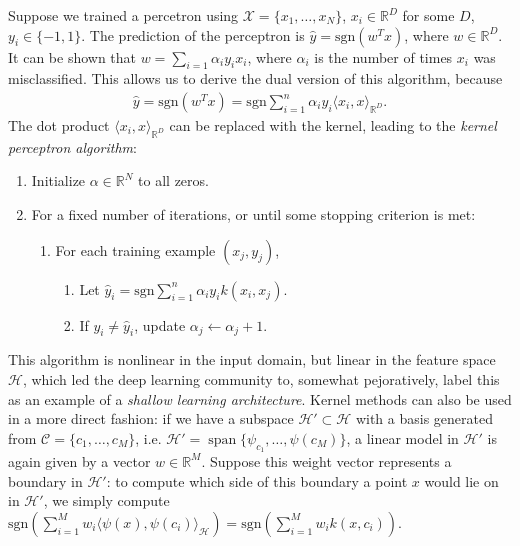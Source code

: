 \documentclass[letterpaper,12pt,peerreviewca,draftcls]{IEEEtran}
\newcommand{\al}{\alpha}
\newcommand{\R}{\mathbb{R}}
\def\l{\langle}
\def\r{\rangle}
\newcommand{\weight}{w}
\newcommand{\fspace}{\mathcal{H}}
\newcommand{\fmap}{\psi}
\newcommand{\kernel}{k}
\newcommand{\sampSet}{\mathcal{X}}
\newcommand{\sampSetLong}{\{x_1, \dots, x_{\nsamp}\}}
\newcommand{\nsamp}{N}
\newcommand{\ncent}{M}
\newcommand{\shCent}{\mathcal{C}}
\newcommand{\shCentLong}{\{c_1,\dots,c_{\ncent}\}}
\newcommand{\sgn}{\mathrm{sgn}}
\def\l{\langle}
\def\r{\rangle}
\DeclareMathOperator{\Span}{span}
\begin{document}
Suppose we trained a percetron using $\sampSet=\sampSetLong$, $x_i\in\R^D$ for some $D$, $y_i\in\{-1, 1\}$.
The prediction of the perceptron is $\hat{y}=\sgn(w^Tx)$, where $\weight\in\R^D$. It can be shown that 
$\weight=\sum_{i=1}\alpha_iy_ix_i$, where $\alpha_i$ is the number of times $x_i$ was misclassified. This allows us
to derive the dual version of this algorithm, because
\begin{align*}
 \hat{y} = \sgn(\weight^Tx) = \sgn\sum_{i=1}^n\al_iy_i\l x_i, x\r_{\R^D}.
\end{align*}
The dot product $\l x_i, x\r_{\R^D}$ can be replaced with the kernel, leading to the \emph{kernel perceptron algorithm}:
\begin{enumerate}
 \item Initialize $\alpha\in\R^{\nsamp}$ to all zeros. 
 \item For a fixed number of iterations, or until some stopping criterion is met:
       \begin{enumerate}
        \item For each training example $(x_j, y_j)$,
              \begin{enumerate}
               \item Let $\hat{y}_i=\sgn\sum_{i=1}^n\al_iy_i\kernel(x_i, x_j)$.
               \item If $y_i\neq\hat{y}_i$, update $\alpha_j \leftarrow \alpha_j + 1$.
              \end{enumerate}
       \end{enumerate}
\end{enumerate}
This algorithm is nonlinear in the input domain, but linear in the feature space $\fspace$, which led the deep learning community to,
somewhat pejoratively, label this as an example of a \emph{shallow learning architecture}.
Kernel methods can also be used in a more direct fashion: if we have a subspace $\fspace'\subset\fspace$ with a basis generated
from $\shCent = \shCentLong$, i.e. $\fspace' = \Span\{\fmap_{c_1},\dots,\fmap(c_{\ncent})\}$,
a linear model in $\fspace'$ is again given
by a vector $\weight\in\R^{\ncent}$. Suppose this weight vector represents a boundary in $\fspace'$: 
to compute which side of this boundary a point $x$ would lie on in $\fspace'$,
we simply compute $\sgn(\sum_{i=1}^{\ncent}\weight_i\l\fmap(x), \fmap(c_i) \r_{\fspace}) = \sgn(\sum_{i=1}^{\ncent}\weight_i\kernel(x,c_i))$.
\end{document}
